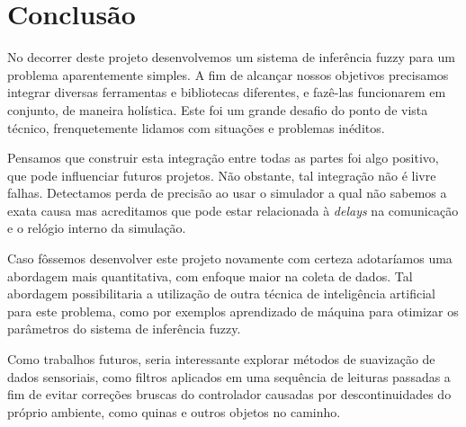 \documentclass[twoside,conference,a4paper]{IEEEtran}
\begin{document}
\section{Conclusão}

No decorrer deste projeto desenvolvemos um sistema de inferência fuzzy para um problema aparentemente simples. A fim de alcançar nossos objetivos precisamos integrar diversas ferramentas e bibliotecas diferentes, e fazê-las funcionarem em conjunto, de maneira holística. Este foi um grande desafio do ponto de vista técnico, frenquetemente lidamos com situações e problemas inéditos.

Pensamos que construir esta integração entre todas as partes foi algo positivo, que pode influenciar futuros projetos. Não obstante, tal integração não é livre falhas. Detectamos perda de precisão ao usar o simulador a qual não sabemos a exata causa mas acreditamos que pode estar relacionada à \textit{delays} na comunicação e o relógio interno da simulação.

Caso fôssemos desenvolver este projeto novamente com certeza adotaríamos uma abordagem mais quantitativa, com enfoque maior na coleta de dados. Tal abordagem possibilitaria a utilização de outra técnica de inteligência artificial para este problema, como por exemplos aprendizado de máquina para otimizar os parâmetros do sistema de inferência fuzzy.

Como trabalhos futuros, seria interessante explorar métodos de suavização de dados sensoriais, como filtros aplicados em uma sequência de leituras passadas a fim de evitar correções bruscas do controlador causadas por descontinuidades do próprio ambiente, como quinas e outros objetos no caminho.




\nocite{*}



\end{document}
